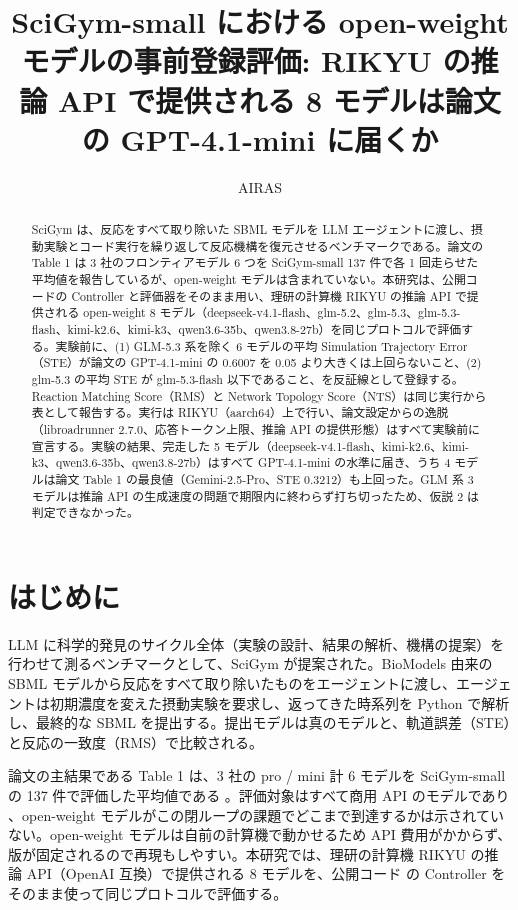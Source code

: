 \documentclass{article}
\title{SciGym-small における open-weight モデルの事前登録評価: RIKYU の推論 API で提供される 8 モデルは論文の GPT-4.1-mini に届くか}
\author{AIRAS}
\begin{document}
\maketitle

\begin{abstract}
SciGym \citep{duan-2025-measuring} は、反応をすべて取り除いた SBML モデルを LLM エージェントに渡し、摂動実験とコード実行を繰り返して反応機構を復元させるベンチマークである。論文の Table 1 は 3 社のフロンティアモデル 6 つを SciGym-small 137 件で各 1 回走らせた平均値を報告しているが、open-weight モデルは含まれていない。本研究は、公開コードの Controller と評価器をそのまま用い、理研の計算機 RIKYU の推論 API で提供される open-weight 8 モデル（deepseek-v4.1-flash、glm-5.2、glm-5.3、glm-5.3-flash、kimi-k2.6、kimi-k3、qwen3.6-35b、qwen3.8-27b）を同じプロトコルで評価する。実験前に、(1) GLM-5.3 系を除く 6 モデルの平均 Simulation Trajectory Error（STE）が論文の GPT-4.1-mini の 0.6007 を 0.05 より大きくは上回らないこと、(2) glm-5.3 の平均 STE が glm-5.3-flash 以下であること、を反証線として登録する。Reaction Matching Score（RMS）と Network Topology Score（NTS）は同じ実行から表として報告する。実行は RIKYU（aarch64）上で行い、論文設定からの逸脱（libroadrunner 2.7.0、応答トークン上限、推論 API の提供形態）はすべて実験前に宣言する。実験の結果、完走した 5 モデル（deepseek-v4.1-flash、kimi-k2.6、kimi-k3、qwen3.6-35b、qwen3.8-27b）はすべて GPT-4.1-mini の水準に届き、うち 4 モデルは論文 Table 1 の最良値（Gemini-2.5-Pro、STE 0.3212）も上回った。GLM 系 3 モデルは推論 API の生成速度の問題で期限内に終わらず打ち切ったため、仮説 2 は判定できなかった。
\end{abstract}

\section{はじめに}
\label{sec:intro}
LLM に科学的発見のサイクル全体（実験の設計、結果の解析、機構の提案）を行わせて測るベンチマークとして、SciGym \citep{duan-2025-measuring} が提案された。BioModels 由来の SBML モデルから反応をすべて取り除いたものをエージェントに渡し、エージェントは初期濃度を変えた摂動実験を要求し、返ってきた時系列を Python で解析し、最終的な SBML を提出する。提出モデルは真のモデルと、軌道誤差（STE）と反応の一致度（RMS）で比較される。

論文の主結果である Table 1 は、3 社の pro / mini 計 6 モデルを SciGym-small の 137 件で評価した平均値である \cite[s1.p2, s1.p10]{duan-2025-measuring}。評価対象はすべて商用 API のモデルであり \cite[s1.p1]{duan-2025-measuring}、open-weight モデルがこの閉ループの課題でどこまで到達するかは示されていない。open-weight モデルは自前の計算機で動かせるため API 費用がかからず、版が固定されるので再現もしやすい。本研究では、理研の計算機 RIKYU の推論 API（OpenAI 互換）で提供される 8 モデルを、公開コード \citep{h4duan-2025-scigym} の Controller をそのまま使って同じプロトコルで評価する。
\end{document}
